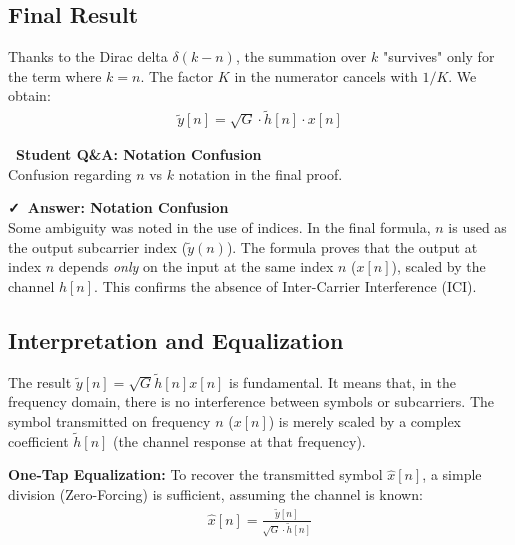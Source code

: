 \documentclass[a4paper, 12pt]{book}
\begin{document}
\subsection{Final Result}
Thanks to the Dirac delta $\delta(k-n)$, the summation over $k$ "survives" only for the term where $k=n$. The factor $K$ in the numerator cancels with $1/K$. We obtain:
\begin{align}
\tilde{y}[n] = \sqrt{G} \cdot \tilde{h}[n] \cdot x[n]
\end{align}

\noindent\colorbox{yellow!25}{
    \parbox{\dimexpr\linewidth-2\fboxsep}{
        \textbf{\faQuestionCircle\ Student Q\&A: Notation Confusion} \\
        \small
        Confusion regarding $n$ vs $k$ notation in the final proof. \\
    }
}

\vspace{0.5em}
\noindent\colorbox{green!15}{
    \parbox{\dimexpr\linewidth-2\fboxsep}{
        \textbf{\faCheck\ Answer: Notation Confusion} \\
        \small
        Some ambiguity was noted in the use of indices. In the final formula, $n$ is used as the output subcarrier index ($\tilde{y}(n)$). The formula proves that the output at index $n$ depends \textit{only} on the input at the same index $n$ ($x[n]$), scaled by the channel $h[n]$. This confirms the absence of Inter-Carrier Interference (ICI).
    }
}

\subsection{Interpretation and Equalization}
The result $\tilde{y}[n] = \sqrt{G} \tilde{h}[n] x[n]$ is fundamental. It means that, in the frequency domain, there is no interference between symbols or subcarriers. The symbol transmitted on frequency $n$ ($x[n]$) is merely scaled by a complex coefficient $\tilde{h}[n]$ (the channel response at that frequency).

\textbf{One-Tap Equalization:}
To recover the transmitted symbol $\hat{x}[n]$, a simple division (Zero-Forcing) is sufficient, assuming the channel is known:
\begin{align}
\hat{x}[n] = \frac{\tilde{y}[n]}{\sqrt{G} \cdot \tilde{h}[n]}
\end{align}
\end{document}
